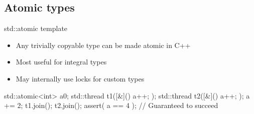 \subsection[atomic]{Atomic types}

\begin{frame}[fragile]
  \begin{block}{std::atomic template}
    \begin{itemize}
      \item Any trivially copyable type can be made atomic in C++
      \item Most useful for integral types
      \item May internally use locks for custom types
    \end{itemize}
  \end{block}
  \begin{exampleblock}{}
    \begin{cppcode*}{}
      std::atomic<int> a{0};
      std::thread t1([&](){ a++; });
      std::thread t2([&](){ a++; });
      a += 2;
      t1.join(); t2.join();
      assert( a == 4 ); // Guaranteed to succeed
    \end{cppcode*}
  \end{exampleblock}
\end{frame}

